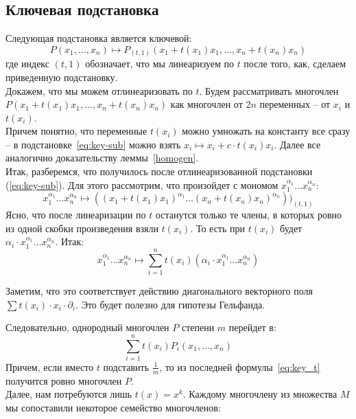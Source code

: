 \subsection{Ключевая подстановка}\label{subsec:key-substitution}
Следующая подстановка является ключевой:
\begin{equation}
    \label{eq:key-sub}
    P(x_1,\ldots,x_n)\mapsto P_{(t, 1)}\left(x_1+t(x_1)x_1,\ldots,x_n+t(x_n)x_n\right)
\end{equation}
где индекс $(t,1)$ обозначает, что мы линеаризуем по $t$ после того, как, сделаем приведенную подстановку.\\
Докажем, что мы можем отлинеаризовать по $t$.
Будем рассматривать многочлен $P(x_1+t(x_1)x_1,\ldots,x_n+t(x_n)x_n)$ как многочлен от $2n$ переменных -- от $x_i$ и $t(x_i)$.\\
Причем понятно, что переменные $t(x_i)$ можно умножать на константу все сразу -- в подстановке~\ref{eq:key-sub} можно взять $x_i\mapsto x_i+c\cdot t(x_i)x_i$.
Далее все аналогично доказательству леммы~\ref{homogen}.\\
Итак, разберемся, что получилось после отлинеаризованной подстановки (\ref{eq:key-sub}). Для этого рассмотрим, что произойдет с мономом $x_1^{\alpha_1}\ldots x_n^{\alpha_n}$:
\[x_1^{\alpha_1}\ldots x_n^{\alpha_n}\mapsto ((x_1+t(x_1)x_1)^{\alpha_1}\ldots (x_n+t(x_n)x_n)^{\alpha_n}))_{(t,1)}\]
Ясно, что после линеаризации по $t$ останутся только те члены, в которых ровно из одной скобки произведения взяли $t(x_i)$.
То есть при $t(x_i)$ будет $\alpha_i\cdot x_1^{\alpha_1}\ldots x_n^{\alpha_n}$.
Итак:
\begin{equation}
    \label{eq:key_monom}
    x_1^{\alpha_1}\ldots x_n^{\alpha_n}\mapsto\sum\limits_{i=1}^n t(x_i)(\alpha_i\cdot x_1^{\alpha_1}\ldots x_n^{\alpha_n})
\end{equation}
\begin{remark}
    Заметим, что это соответствует действию диагонального векторного поля $\sum t(x_i) \cdot x_i \cdot \partial_i$.
    Это будет полезно для гипотезы Гельфанда.
\end{remark}
Следовательно, однородный многочлен $P$ степени $m$ перейдет в:
\begin{equation}
    \label{eq:key_t}
    \sum\limits_{i=1}^n t(x_i)P_i(x_1,\ldots,x_n)
\end{equation}
Причем, если вместо $t$ подставить $\frac{1}{m}$, то из последней формулы~\eqref{eq:key_t} получится ровно многочлен $P$.\\
Далее, нам потребуются лишь $t(x)=x^k$.
Каждому многочлену из множества $M$ мы сопоставили некоторое семейство многочленов:
